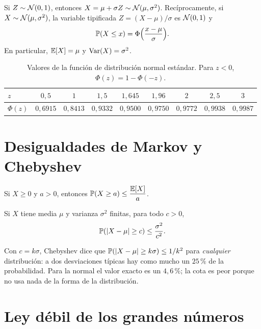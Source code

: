 \begin{teorema}[Tipificación]\label{teo:t6-tipificacion}
Si $Z\sim\mathcal{N}(0,1)$, entonces $X=\mu+\sigma Z\sim\mathcal{N}(\mu,\sigma^{2})$. Recíprocamente, si $X\sim\mathcal{N}(\mu,\sigma^{2})$, la variable tipificada $Z=(X-\mu)/\sigma$ es $\mathcal{N}(0,1)$ y
\[
\mathbb{P}(X\le x)=\Phi\Bigl(\frac{x-\mu}{\sigma}\Bigr).
\]
En particular, $\mathbb{E}[X]=\mu$ y $\operatorname{Var}(X)=\sigma^{2}$.
\end{teorema}

\begin{table}[h]
\centering
\begin{tabular}{@{}lcccccccc@{}}
\toprule
$z$ & $0{,}5$ & $1$ & $1{,}5$ & $1{,}645$ & $1{,}96$ & $2$ & $2{,}5$ & $3$ \\
\midrule
$\Phi(z)$ & $0{,}6915$ & $0{,}8413$ & $0{,}9332$ & $0{,}9500$ & $0{,}9750$ & $0{,}9772$ & $0{,}9938$ & $0{,}9987$ \\
\bottomrule
\end{tabular}
\caption{Valores de la función de distribución normal estándar. Para $z<0$, $\Phi(z)=1-\Phi(-z)$.}
\label{tab:t6-phi}
\end{table}

\addtocounter{definicion}{1}%

\section{Desigualdades de Markov y Chebyshev}

\begin{teorema}\label{teo:t6-markov}
Si $X\ge0$ y $a>0$, entonces $\mathbb{P}(X\ge a)\le\dfrac{\mathbb{E}[X]}{a}$.
\end{teorema}

\begin{teorema}\label{teo:t6-chebyshev}
Si $X$ tiene media $\mu$ y varianza $\sigma^{2}$ finitas, para todo $c>0$,
\[
\mathbb{P}(\lvert X-\mu\rvert\ge c)\le\frac{\sigma^{2}}{c^{2}}.
\]
\end{teorema}

Con $c=k\sigma$, Chebyshev dice que $\mathbb{P}(\lvert X-\mu\rvert\ge k\sigma)\le1/k^{2}$ para \emph{cualquier} distribución: a dos desviaciones típicas hay como mucho un $25\,\%$ de la probabilidad. Para la normal el valor exacto es un $4{,}6\,\%$; la cota es peor porque no usa nada de la forma de la distribución.

\section{Ley débil de los grandes números}

